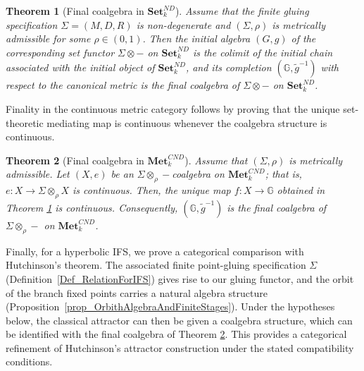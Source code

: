 \documentclass{sn-jnl}%
\theoremstyle{thmstyleone}%
\newtheorem{theorem}{Theorem}%
\theoremstyle{thmstyletwo}%
\theoremstyle{thmstylethree}%
\newcommand{\setnd}{\mathbf{Set}_{k}^{ND}}
\newcommand{\mcnd}{\mathbf{Met}_{k}^{CND}}
\newcommand{\M}{\Sigma}
\newcommand{\F}{\M\otimes}
\newcommand{\Fw}{\M\otimes_{\w}}
\newcommand{\G}{\mathbb{G}}
\newcommand{\g}{\tilde{g}^{-1}}
\newcommand{\w}{\rho}
\begin{document}
\begin{theorem}[Final coalgebra in $\setnd$]
\label{Thm_FinalCoalgebraInSet}
     Assume that the finite gluing specification $\Sigma=(M,D,R)$ is non-degenerate and  $(\Sigma,\w)$ is metrically admissible for some $\w \in (0,1)$. 
     Then the initial algebra $(G, g)$ of the corresponding set functor $\F-$ on $\setnd$ is the colimit of the initial chain associated with the initial object of $\setnd$, and its completion $(\G, \g)$ with respect to the canonical metric is the final coalgebra of $\F-$ on $\setnd$.
\end{theorem} 

Finality in the continuous metric category follows by proving that the unique set-theoretic mediating map is continuous whenever the coalgebra structure is continuous.

\begin{theorem}[Final coalgebra in $\mcnd$]
\label{Thm_FinalCoalgebraInMet}
    Assume that $(\Sigma,\w)$ is metrically admissible. Let $(X,e)$ be an $\Fw-$coalgebra on $\mcnd$; that is, $e:X\rightarrow \Fw X$ is continuous.  Then, the unique map $f:X\rightarrow \G$ obtained in Theorem \ref{Thm_FinalCoalgebraInSet} is continuous.  Consequently, $(\G,\g)$ is the final coalgebra of $\Fw-$ on $\mcnd$.
\end{theorem}

Finally, for a hyperbolic IFS, we prove a categorical comparison with Hutchinson's theorem. The associated finite point-gluing specification $\Sigma$ (Definition~\ref{Def_RelationForIFS}) gives rise to our gluing functor, and the orbit of the branch fixed points carries a natural algebra structure (Proposition~\ref{prop_OrbithAlgebraAndFiniteStages}). Under the hypotheses below, the classical attractor can then be given a coalgebra structure, which can be identified with the final coalgebra of Theorem \ref{Thm_FinalCoalgebraInMet}. This provides a categorical refinement of Hutchinson's attractor construction under the stated compatibility conditions.
\end{document}
